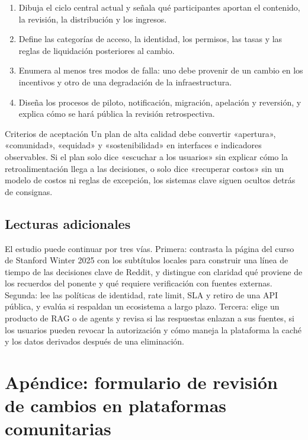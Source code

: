 \documentclass[a4paper]{article}
\begin{document}
\begin{enumerate}
  \item Dibuja el ciclo central actual y señala qué participantes aportan el contenido, la revisión, la distribución y los ingresos.
  \item Define las categorías de acceso, la identidad, los permisos, las tasas y las reglas de liquidación posteriores al cambio.
  \item Enumera al menos tres modos de falla: uno debe provenir de un cambio en los incentivos y otro de una degradación de la infraestructura.
  \item Diseña los procesos de piloto, notificación, migración, apelación y reversión, y explica cómo se hará pública la revisión retrospectiva.
\end{enumerate}

\begin{knowledgebox}{Criterios de aceptación}
Un plan de alta calidad debe convertir «apertura», «comunidad», «equidad» y «sostenibilidad» en interfaces e indicadores observables. Si el plan solo dice «escuchar a los usuarios» sin explicar cómo la retroalimentación llega a las decisiones, o solo dice «recuperar costos» sin un modelo de costos ni reglas de excepción, los sistemas clave siguen ocultos detrás de consignas.
\end{knowledgebox}

\subsection{Lecturas adicionales}

El estudio puede continuar por tres vías. Primera: contrasta la página del curso de Stanford Winter 2025 con los subtítulos locales para construir una línea de tiempo de las decisiones clave de Reddit, y distingue con claridad qué proviene de los recuerdos del ponente y qué requiere verificación con fuentes externas. Segunda: lee las políticas de identidad, rate limit, SLA y retiro de una API pública, y evalúa si respaldan un ecosistema a largo plazo. Tercera: elige un producto de RAG o de agents y revisa si las respuestas enlazan a sus fuentes, si los usuarios pueden revocar la autorización y cómo maneja la plataforma la caché y los datos derivados después de una eliminación.

\section{Apéndice: formulario de revisión de cambios en plataformas comunitarias}
\end{document}
